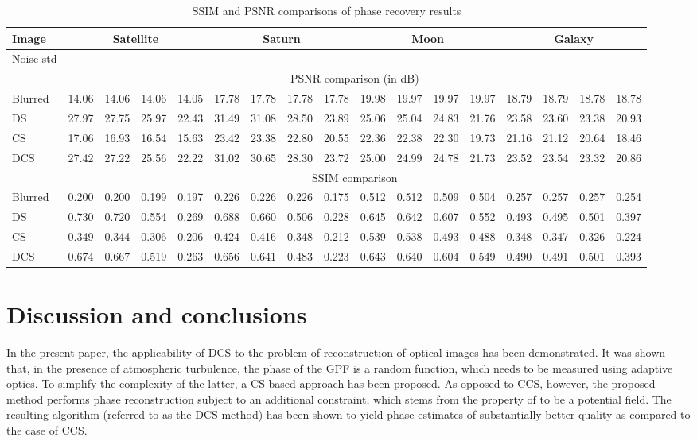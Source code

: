 \pdfoutput=1 \documentclass[journal]{IEEEtran}
\begin{document}
\begin{table*}[t]
\centering \caption{SSIM and PSNR comparisons of phase recovery
results}
\label{tab:denresults}
\begin{tabular}{l|cccc|cccc|cccc|cccc}
\hline
Image & \multicolumn{4}{c}{Satellite} & \multicolumn{4}{c}{Saturn} & \multicolumn{4}{c}{Moon} & \multicolumn{4}{c}{Galaxy}\\
\hline
Noise std &  &  &  &  &  &   &  &   &  &   &  &   &  &   &  &  \\
\hline
& \multicolumn{16}{c}{PSNR comparison (in dB)}\\
\hline
Blurred               & 14.06 & 14.06 & 14.06 & 14.05 & 17.78 & 17.78 & 17.78 &  17.78 & 19.98 & 19.97 & 19.97 &  19.97 & 18.79 & 18.79 & 18.78 &  18.78\\
DS                & 27.97 & 27.75 & 25.97 & 22.43 & 31.49 & 31.08 & 28.50 &  23.89 & 25.06 & 25.04 & 24.83 &  21.76 & 23.58 & 23.60 & 23.38 &  20.93\\
CS                    & 17.06 & 16.93 & 16.54 & 15.63 & 23.42 & 23.38 & 22.80 &  20.55 & 22.36 & 22.38 & 22.30 &  19.73 & 21.16 & 21.12 & 20.64 & 18.46\\
DCS                   & 27.42 & 27.22 & 25.56 & 22.22 & 31.02 & 30.65 & 28.30 &  23.72 & 25.00 & 24.99 & 24.78 &  21.73 & 23.52 & 23.54 & 23.32 & 20.86\\
\hline
& \multicolumn{16}{c}{SSIM comparison}\\
\hline
Blurred               & 0.200 & 0.200 & 0.199 & 0.197 & 0.226 & 0.226 & 0.226 & 0.175 & 0.512 & 0.512 & 0.509 & 0.504 & 0.257 & 0.257 & 0.257 & 0.254\\
DS               & 0.730 & 0.720 & 0.554 & 0.269 & 0.688 & 0.660 & 0.506 & 0.228 & 0.645 & 0.642 & 0.607 & 0.552 & 0.493 & 0.495 & 0.501 & 0.397\\
CS                    & 0.349 & 0.344 & 0.306 & 0.206 & 0.424 & 0.416 & 0.348 & 0.212 & 0.539 & 0.538 & 0.493 & 0.488 & 0.348 & 0.347 & 0.326 & 0.224\\
DCS                   & 0.674 & 0.667 & 0.519 & 0.263 & 0.656 & 0.641 & 0.483 & 0.223 & 0.643 & 0.640 & 0.604 & 0.549 & 0.490 & 0.491 & 0.501 & 0.393\\
\hline
\end{tabular}
\end{table*}

\section{Discussion and conclusions}
In the present paper, the applicability of DCS to the problem of reconstruction of optical images has been demonstrated. It was shown that, in the presence of atmospheric turbulence, the phase  of the GPF  is a random function, which needs to be measured using adaptive optics. To simplify the complexity of the latter, a CS-based approach has been proposed. As opposed to CCS, however, the proposed method performs phase reconstruction subject to an additional constraint, which stems from the property of  to be a potential field. The resulting algorithm (referred to as the DCS method) has been shown to yield phase estimates of substantially better quality as compared to the case of CCS.
\end{document}
